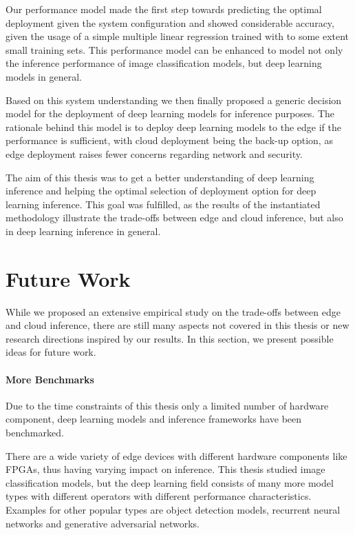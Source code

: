 Our performance model made the first step towards predicting the optimal deployment given the system configuration and showed considerable accuracy, given the usage of a simple multiple linear regression trained with to some extent small training sets.
This performance model can be enhanced to model not only the inference performance of image classification models, but deep learning models in general.

Based on this system understanding we then finally proposed a generic decision model for the deployment of deep learning models for inference purposes. The rationale behind this model is to deploy deep learning models to the edge if the performance is sufficient, with cloud deployment being the back-up option, as edge deployment raises fewer concerns regarding network and security.


The aim of this thesis was to get a better understanding of deep learning inference and helping the optimal selection of deployment option for deep learning inference.
This goal was fulfilled, as the results of the instantiated methodology illustrate the trade-offs between edge and cloud inference, but also in deep learning inference in general.




\section{Future Work}
While we proposed an extensive empirical study on the trade-offs between edge and cloud inference, there are still many aspects not covered in this thesis or new research directions inspired by our results. 
In this section, we present possible ideas for future work.

\paragraph{More Benchmarks}
Due to the time constraints of this thesis only a limited number of hardware component, deep learning models and inference frameworks have been benchmarked.

There are a wide variety of edge devices with different hardware components like FPGAs, thus having varying impact on inference.
This thesis studied image classification models, but the deep learning field consists of many more model types with different operators with different performance characteristics.
Examples for other popular types are object detection models, recurrent neural networks and generative adversarial networks.

